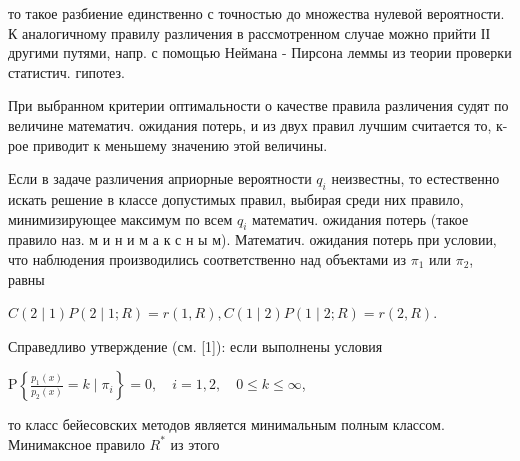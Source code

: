 \documentclass[10pt]{article}
\begin{document}
то такое разбиение единственно с точностью до множества нулевой вероятности. К аналогичному правилу различения в рассмотренном случае можно прийти ІІ другими путями, напр. с помощью Неймана - Пирсона леммы из теории проверки статистич. гипотез.



При выбранном критерии оптимальности о качестве правила различения судят по величине математич. ожидания потерь, и из двух правил лучшим считается то, к-рое приводит к меньшему значению этой величины.



Если в задаче различения априорные вероятности $q_{i}$ неизвестны, то естественно искать решение в классе допустимых правил, выбирая среди них правило, минимизирующее максимум по всем $q_{i}$ математич. ожидания потерь (такое правило наз. м и н и м а к с н ы м). Математич. ожидания потерь при условии, что наблюдения производились соответственно над объектами из $\pi_{1}$ или $\pi_{2}$, равны



$C(2 \mid 1) P(2 \mid 1 ; R)=r(1, R), C(1 \mid 2) P(1 \mid 2 ; R)=r(2, R)$.



Справедливо утверждение (см. [1]): если выполнены условия



$\mathrm{P}\left\{\frac{p_{1}(x)}{p_{2}(x)}=k \mid \pi_{i}\right\}=0, \quad i=1,2, \quad 0 \leqslant k \leqslant \infty$,



то класс бейесовских методов является минимальным полным классом. Минимаксное правило $R^{*}$ из этого
\end{document}
